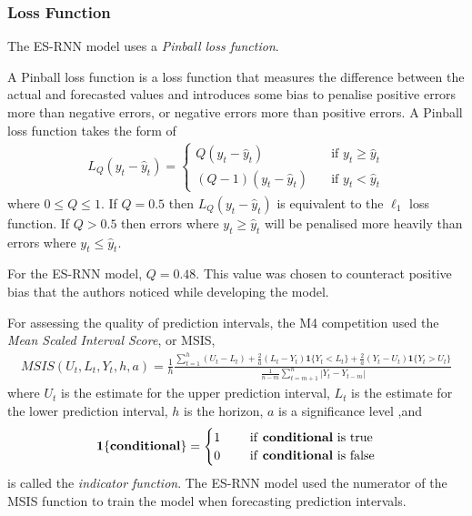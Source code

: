 \documentclass[a4paper,12pt]{article}
\theoremstyle{definition}
\newcommand{\modu}[1]{\left| #1 \right|} %
\begin{document}
\subsubsection{Loss Function}
The ES-RNN model uses a \textit{Pinball loss function}. 

A Pinball loss function is a loss function that measures the difference between the actual and forecasted values and introduces some bias to penalise positive errors more than negative errors, or negative errors more than positive errors. A Pinball loss function takes the form of 
\begin{align}
	L_Q(y_t - \hat{y}_t) =  	\begin{cases}
						Q(y_t - \hat{y}_t) &\quad \text{if } y_t \geq \hat{y}_t \\
						(Q-1)(y_t - \hat{y}_t) &\quad \text{if } y_t < \hat{y}_t
					\end{cases}
\end{align}
where $0 \leq Q \leq 1$. If $Q = 0.5$ then $L_Q(y_t - \hat{y}_t)$ is equivalent to the $\ell_1$ loss function. If $Q > 0.5$ then errors where $y_t \geq \hat{y}_t$ will be penalised more heavily than errors where $y_t \leq \hat{y}_t$.

For the ES-RNN model, $Q = 0.48$. This value was chosen to counteract positive bias that the authors noticed while developing the model.

For assessing the quality of prediction intervals, the M4 competition used the \textit{Mean Scaled Interval Score}, or MSIS,
\begin{align}
	MSIS(U_t, L_t, Y_t, h, a) = \frac{1}{h}\frac{\sum_{t=1}^h (U_t - L_t) + \frac{2}{a}(L_t - Y_t)\mathbf{1}\{ Y_t < L_t \} + \frac{2}{a}(Y_t - U_t)\mathbf{1}\{ Y_t > U_t \}}{\frac{1}{n-m}\sum_{t=m+1}^n\modu{Y_t - Y_{t-m}}}
\end{align}
where $U_t$ is the estimate for the upper prediction interval, $L_t$ is the estimate for the lower prediction interval, $h$ is the horizon, $a$ is a significance level ,and 
\begin{align}
	\mathbf{1}\{ \text{\textbf{conditional}} \} = 	\begin{cases}
									1 &\quad \text{ if \textbf{conditional} is true} \\
									0 &\quad \text{ if \textbf{conditional} is false} \\
								\end{cases}
\end{align}
is called the \textit{indicator function}. The ES-RNN model used the numerator of the MSIS function to train the model when forecasting prediction intervals.

\newpage


\end{document}

